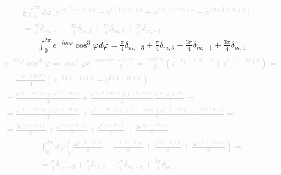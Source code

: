 %
\textcolor{lightgray}{ \begin{equation*} \begin{aligned}
\frac{i}{8} \int_{0}^{2 \pi} d \varphi \big( e^{-i (3+m) \varphi} - 
e^{i (1-m) \varphi} + e^{-i (3-m) \varphi} + e^{-i (1+m) \varphi} \big) = \\
= \frac{\pi i }{4} \delta_{m,-3} - \frac{\pi i }{4} \delta_{m,1} + 
\frac{\pi i }{4} \delta_{m,3} + \frac{\pi i }{4} \delta_{m,-1}
\end{aligned} \end{equation*} }
%
\begin{equation} \begin{aligned} \label{eq:int_exp6}
\int_{0}^{2\pi} e^{-i m \varphi} \cos^3 \varphi d \varphi = 
\frac{\pi}{4} \delta_{m,-3} + \frac{\pi}{4} \delta_{m,3} + 
\frac{3 \pi}{4} \delta_{m,-1} + \frac{3 \pi}{4} \delta_{m,1}
\end{aligned} \end{equation}
%
\textcolor{lightgray}{ \begin{equation*} \begin{aligned}
e^{-i m \varphi} \cos^3 \varphi = 
\cos^2 \varphi e^{-i m \varphi} \frac{e^{i \varphi} + e^{-i \varphi}}{2} =
\frac{\cos^2 \varphi}{2} 
\left( e^{-i (1+m) \varphi} + e^{i (1-m) \varphi} \right) = \\
= \frac{ 1 + \cos 2 \varphi } { 4 } 
\left( e^{-i (1+m) \varphi} + e^{i (1-m) \varphi} \right) = \\
= \frac{e^{-i(1+m) \varphi} + e^{i(1-m) \varphi}}{4} + 
\frac{e^{-i(1+m) \varphi} + e^{i(1-m) \varphi}}{4}
\frac{e^{2i\varphi} + e^{-2i\varphi}}{2} = \\
= \frac{e^{-i(1+m) \varphi} + e^{i(1-m) \varphi}}{4} +
\frac{ e^{i(1-m) \varphi} + e^{-i(3+m) \varphi} + 
e^{i(3-m) \varphi} + e^{-i(1+m) \varphi} }{8} = \\
= \frac{3 e^{i(1-m) \varphi}}{8} + \frac{e^{-i(3+m) \varphi}}{8} +
\frac{e^{i(3-m) \varphi}}{8} + \frac{ 3 e^{-i(1+m) \varphi} }{8}
\end{aligned} \end{equation*} }
%
\textcolor{lightgray}{ \begin{equation*} \begin{aligned}
\int_{0}^{2\pi} d \varphi \left( \frac{3 e^{i(1-m) \varphi}}{8} + 
\frac{e^{-i(3+m) \varphi}}{8} + \frac{e^{i(3-m) \varphi}}{8} + 
\frac{ 3 e^{-i(1+m) \varphi} }{8} \right) = \\
= \frac{\pi}{4} \delta_{m,-3} + \frac{\pi}{4} \delta_{m,3} + 
\frac{3 \pi}{4} \delta_{m,-1} + \frac{3 \pi}{4} \delta_{m,1}
\end{aligned} \end{equation*} }
